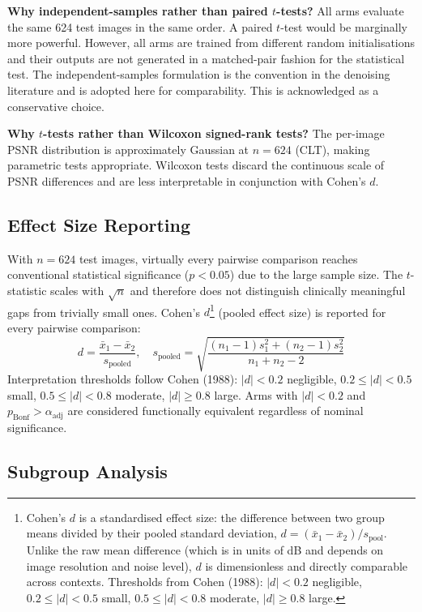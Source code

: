 \documentclass[12pt, a4paper, twoside, openright]{book}
\begin{document}
\textbf{Why independent-samples rather than paired $t$-tests?} All arms evaluate the same 624 test images in the same order. A paired $t$-test would be marginally more powerful. However, all arms are trained from different random initialisations and their outputs are not generated in a matched-pair fashion for the statistical test. The independent-samples formulation is the convention in the denoising literature \cite{zhang_beyond_2017, liang_swinir_2021} and is adopted here for comparability. This is acknowledged as a conservative choice.

\textbf{Why $t$-tests rather than Wilcoxon signed-rank tests?} The per-image PSNR distribution is approximately Gaussian at $n=624$ (CLT), making parametric tests appropriate. Wilcoxon tests discard the continuous scale of PSNR differences and are less interpretable in conjunction with Cohen's $d$.

\subsection{Effect Size Reporting}

With $n=624$ test images, virtually every pairwise comparison reaches conventional statistical significance ($p<0.05$) due to the large sample size. The $t$-statistic scales with $\sqrt{n}$ and therefore does not distinguish clinically meaningful gaps from trivially small ones. Cohen's $d$\footnote{Cohen's $d$ is a standardised effect size: the difference between two group means divided by their pooled standard deviation, $d = (\bar{x}_1 - \bar{x}_2)/s_{\mathrm{pool}}$. Unlike the raw mean difference (which is in units of dB and depends on image resolution and noise level), $d$ is dimensionless and directly comparable across contexts. Thresholds from Cohen (1988): $|d|<0.2$ negligible, $0.2\leq|d|<0.5$ small, $0.5\leq|d|<0.8$ moderate, $|d|\geq 0.8$ large.} (pooled effect size) is reported for every pairwise comparison:
\begin{equation}
d = \frac{\bar{x}_1 - \bar{x}_2}{s_{\mathrm{pooled}}}, \quad
s_{\mathrm{pooled}} = \sqrt{\frac{(n_1-1)s_1^2 + (n_2-1)s_2^2}{n_1+n_2-2}}
\end{equation}
Interpretation thresholds follow Cohen (1988): $|d| < 0.2$ negligible, $0.2 \leq |d| < 0.5$ small, $0.5 \leq |d| < 0.8$ moderate, $|d| \geq 0.8$ large. Arms with $|d| < 0.2$ and $p_{\mathrm{Bonf}} > \alpha_{\mathrm{adj}}$ are considered functionally equivalent regardless of nominal significance.

\subsection{Subgroup Analysis}
\end{document}
